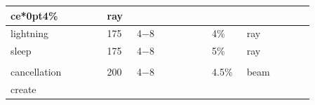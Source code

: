 \begin{longtable}{|>{\RaggedRight}p{0.27477\linewidth}|>{\RaggedRight}p{0.08330\linewidth}|>{\RaggedRight}p{0.21924\linewidth}|>{\RaggedRight}p{0.08716\linewidth}|>{\RaggedRight}p{0.19267\linewidth}|}
ce*{0pt}4\%&\hspace*{0pt}\ignorespaces{}\hspace*{0pt}ray\\ \hline \hspace*{0pt}\ignorespaces{}\hspace*{0pt}lightning\footnotemark[42]&\hspace*{0pt}\ignorespaces{}\hspace*{0pt}175&\hspace*{0pt}\ignorespaces{}\hspace*{0pt}4{\mbox{$-$}}8&\hspace*{0pt}\ignorespaces{}\hspace*{0pt}4\%&\hspace*{0pt}\ignorespaces{}\hspace*{0pt}ray\\ \hline \hspace*{0pt}\ignorespaces{}\hspace*{0pt}sleep\footnotemark[43]&\hspace*{0pt}\ignorespaces{}\hspace*{0pt}175&\hspace*{0pt}\ignorespaces{}\hspace*{0pt}4{\mbox{$-$}}8&\hspace*{0pt}\ignorespaces{}\hspace*{0pt}5\%&\hspace*{0pt}\ignorespaces{}\hspace*{0pt}ray\\ \hline \multicolumn{5}{|>{\RaggedRight}p{0.97143\linewidth}|}{\hspace*{0pt}\ignorespaces{}\hspace*{0pt}}\\ \hline \hspace*{0pt}\ignorespaces{}\hspace*{0pt}cancellation\footnotemark[44]&\hspace*{0pt}\ignorespaces{}\hspace*{0pt}200&\hspace*{0pt}\ignorespaces{}\hspace*{0pt}4{\mbox{$-$}}8&\hspace*{0pt}\ignorespaces{}\hspace*{0pt}4.5\%&\hspace*{0pt}\ignorespaces{}\hspace*{0pt}beam\\ \hline \hspace*{0pt}\ignorespaces{}\hspace*{0pt}create 
\end{longtable}
